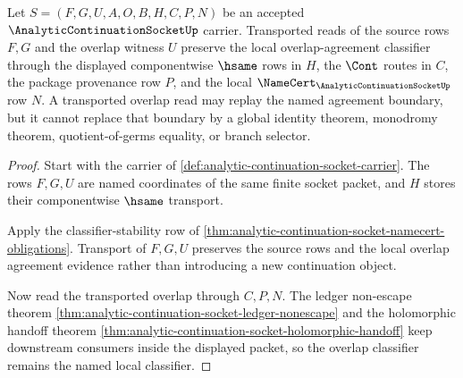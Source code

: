 \begin{theorem}
\label{thm:analytic-continuation-socket-overlap-classifier-stability}
Let $S=(F,G,U,A,O,B,H,C,P,N)$ be an accepted $\AnalyticContinuationSocketUp$ carrier. Transported reads of the source rows $F,G$ and the overlap witness $U$ preserve the local overlap-agreement classifier through the displayed componentwise $\hsame$ rows in $H$, the $\Cont$ routes in $C$, the package provenance row $P$, and the local $\NameCert_{\AnalyticContinuationSocketUp}$ row $N$. A transported overlap read may replay the named agreement boundary, but it cannot replace that boundary by a global identity theorem, monodromy theorem, quotient-of-germs equality, or branch selector.
\end{theorem}
\begin{proof}
Start with the carrier of \autoref{def:analytic-continuation-socket-carrier}. The rows $F,G,U$ are named coordinates of the same finite socket packet, and $H$ stores their componentwise $\hsame$ transport.

Apply the classifier-stability row of \autoref{thm:analytic-continuation-socket-namecert-obligations}. Transport of $F,G,U$ preserves the source rows and the local overlap agreement evidence rather than introducing a new continuation object.

Now read the transported overlap through $C,P,N$. The ledger non-escape theorem \autoref{thm:analytic-continuation-socket-ledger-nonescape} and the holomorphic handoff theorem \autoref{thm:analytic-continuation-socket-holomorphic-handoff} keep downstream consumers inside the displayed packet, so the overlap classifier remains the named local classifier.
\end{proof}

